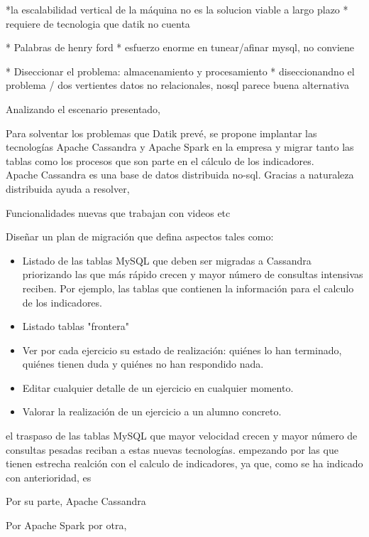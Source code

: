 *la escalabilidad vertical de la máquina no es la solucion viable a largo plazo
* requiere de tecnologia que datik no cuenta

* Palabras de henry ford
* esfuerzo enorme en tunear/afinar mysql, no conviene

* Diseccionar el problema: almacenamiento y procesamiento
* diseccionandno el problema / dos vertientes
datos no relacionales, nosql parece buena alternativa

Analizando el escenario presentado, 

Para solventar los problemas que Datik prevé, se propone implantar las tecnologías Apache Cassandra y Apache Spark en la empresa y migrar tanto las tablas como los procesos que son parte en el cálculo de los indicadores.\\


Apache Cassandra es una base de datos distribuida no-sql. Gracias a naturaleza distribuida ayuda a resolver, 

Funcionalidades nuevas que trabajan con videos etc




Diseñar un plan de migración que defina aspectos tales como: 

\begin{itemize}
	\item Listado de las tablas MySQL que deben ser migradas a Cassandra priorizando las que más rápido crecen y mayor número de consultas intensivas reciben. Por ejemplo, las tablas que contienen la información para el calculo de los indicadores.
	\item Listado tablas "frontera"
	\item Ver por cada ejercicio su estado de realización: quiénes lo han terminado, quiénes tienen duda y quiénes no han respondido nada.
	\item Editar cualquier detalle de un ejercicio en cualquier momento.
	\item Valorar la realización de un ejercicio a un alumno concreto.
\end{itemize}

el traspaso de las tablas MySQL que mayor velocidad crecen  y mayor número de consultas pesadas reciban a estas nuevas tecnologías. empezando por las que tienen estrecha realción con el calculo de indicadores, ya que, como se ha indicado con anterioridad, es  

Por su parte, Apache Cassandra

Por Apache Spark por otra,

